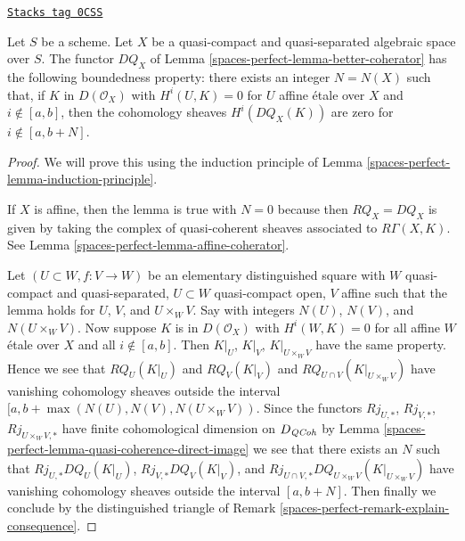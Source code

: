 \begin{lemma}
\label{spaces-perfect-lemma-boundedness-better-coherator}
\href{https://stacks.math.columbia.edu/tag/0CSS}{\texttt{Stacks tag 0CSS}}

Let $S$ be a scheme.
Let $X$ be a quasi-compact and quasi-separated algebraic space over $S$.
The functor $DQ_X$ of Lemma \ref{spaces-perfect-lemma-better-coherator}
has the following boundedness property:
there exists an integer $N = N(X)$ such that, if
$K$ in $D(\mathcal{O}_X)$ with
$H^i(U, K) = 0$ for $U$ affine \'etale over $X$ and $i \not \in [a, b]$, then
the cohomology sheaves $H^i(DQ_X(K))$ are zero for
$i \not \in [a, b + N]$.
\end{lemma}

\begin{proof}
We will prove this using the induction principle of
Lemma \ref{spaces-perfect-lemma-induction-principle}.

\medskip\noindent
If $X$ is affine, then the lemma is true with $N = 0$ because then
$RQ_X = DQ_X$ is given by taking the complex of
quasi-coherent sheaves associated to $R\Gamma(X, K)$.
See Lemma \ref{spaces-perfect-lemma-affine-coherator}.

\medskip\noindent
Let $(U \subset W, f : V \to W)$ be an elementary distinguished square
with $W$ quasi-compact and quasi-separated, $U \subset W$
quasi-compact open, $V$ affine such that
the lemma holds for $U$, $V$, and $U \times_W V$.
Say with integers $N(U)$, $N(V)$, and $N(U \times_W V)$.
Now suppose $K$ is in $D(\mathcal{O}_X)$ with
$H^i(W, K) = 0$ for all affine $W$ \'etale over $X$ and all $i \not \in [a, b]$.
Then $K|_U$, $K|_V$, $K|_{U \times_W V}$ have the same property.
Hence we see that $RQ_U(K|_U)$ and $RQ_V(K|_V)$ and
$RQ_{U \cap V}(K|_{U \times_W V})$ have vanishing cohomology
sheaves outside the interval $[a, b + \max(N(U), N(V), N(U \times_W V))$.
Since the functors $Rj_{U, *}$, $Rj_{V, *}$, $Rj_{U \times_W V, *}$
have finite cohomological dimension on $D_{\mathit{QCoh}}$ by
Lemma \ref{spaces-perfect-lemma-quasi-coherence-direct-image}
we see that there exists an $N$ such that
$Rj_{U, *}DQ_U(K|_U)$, $Rj_{V, *}DQ_V(K|_V)$, and
$Rj_{U \cap V, *}DQ_{U \times_W V}(K|_{U \times_W V})$ have vanishing
cohomology sheaves outside the interval $[a, b + N]$.
Then finally we conclude by the distinguished triangle
of Remark \ref{spaces-perfect-remark-explain-consequence}.
\end{proof}

